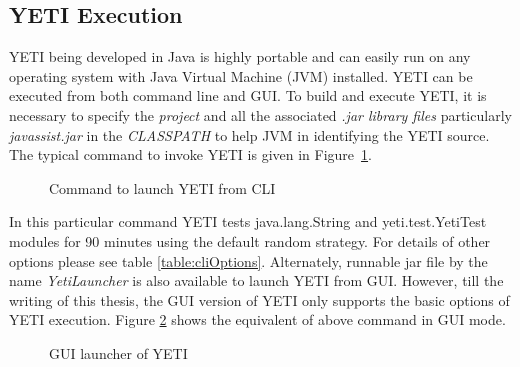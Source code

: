 \subsection{YETI Execution}
YETI being developed in Java is highly portable and can easily run on any operating system with Java Virtual Machine (JVM) installed. YETI can be executed from both command line and GUI. To build and execute YETI, it is necessary to specify the {\it project} and all the associated {\it .jar library files} particularly {\it javassist.jar} in the {\it CLASSPATH} to help JVM in identifying the YETI source. The typical command to invoke YETI is given in Figure~\ref{fig:yeticommand}.

\begin{figure}[h!]
	\centering
	\caption{Command to launch YETI from CLI}
	\label{fig:yeticommand}
\end{figure}

 In this particular command YETI tests java.lang.String and yeti.test.YetiTest modules for 90 minutes using the default random strategy. For details of other options please see table \ref{table:cliOptions}. Alternately, runnable jar file by the name {\it YetiLauncher} is also available to launch YETI from GUI. However, till the writing of this thesis, the GUI version of YETI only supports the basic options of YETI execution. Figure \ref{fig:yetiLauncher} shows the equivalent of above command in GUI mode.

\begin{figure}[h]
	\centering
	\caption{GUI launcher of YETI}
	\label{fig:yetiLauncher}
\end{figure}


